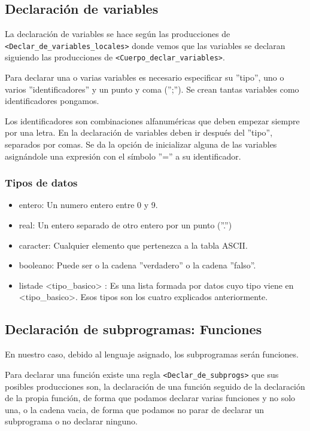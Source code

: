 \documentclass[12pt, spanish]{article}
\begin{document}
\subsection{Declaración de variables}

La declaración de variables se hace según las producciones de \texttt{<Declar_de_variables_locales>} donde vemos que las variables se declaran siguiendo las producciones de \texttt{<Cuerpo_declar_variables>}.


Para declarar una o varias variables es necesario especificar su ''tipo'', uno o varios ''identificadores'' y un punto y coma ('';''). Se crean tantas variables como identificadores pongamos.


Los identificadores son combinaciones alfanuméricas que deben empezar siempre por una letra. En la declaración de variables deben ir después del ''tipo'', separados por comas. Se da la opción de inicializar alguna de las variables asignándole una expresión con el símbolo ''='' a su identificador.

\subsubsection{Tipos de datos}

\begin{itemize}

	\item entero: Un numero entero entre 0 y 9.
	\item real: Un entero separado de otro entero por un punto (''.'')
	\item caracter: Cualquier elemento que pertenezca a la tabla ASCII.
	\item booleano: Puede ser o la cadena ''verdadero'' o la cadena ''falso''.
	\item listade <tipo_basico> : Es una lista formada por datos cuyo tipo viene en <tipo_basico>. Esos tipos son los cuatro explicados anteriormente.
\end{itemize}

\subsection{Declaración de subprogramas: Funciones}

En nuestro caso, debido al lenguaje asignado, los subprogramas serán funciones.

Para declarar una función existe una regla \texttt{<Declar_de_subprogs>} que sus posibles producciones son, la declaración de una función seguido de la declaración de la propia función, de forma que podamos declarar varias funciones y no solo una, o la cadena vacia, de forma que podamos no parar de declarar un subprograma o no declarar ninguno.
\end{document}
